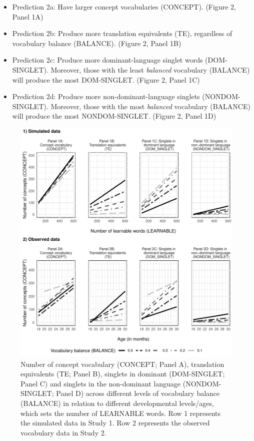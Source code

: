\documentclass[
  english,
  ,man,floatsintext]{apa6}
\providecommand{\tightlist}{%
  \setlength{\itemsep}{0pt}\setlength{\parskip}{0pt}}
\begin{document}
\begin{itemize}
\tightlist
\item
  Prediction 2a: Have larger concept vocabularies (CONCEPT). (Figure 2, Panel 1A)
\item
  Prediction 2b: Produce more translation equivalents (TE), regardless of vocabulary balance (BALANCE). (Figure 2, Panel 1B)
\item
  Prediction 2c: Produce more dominant-language singlet words (DOM-SINGLET). Moreover, those with the least \emph{balanced} vocabulary (BALANCE) will produce the most DOM-SINGLET. (Figure 2, Panel 1C)
\item
  Prediction 2d: Produce more non-dominant-language singlets (NONDOM-SINGLET). Moreover, those with the most \emph{balanced} vocabulary (BALANCE) will produce the most NONDOM-SINGLET. (Figure 2, Panel 1D)
\end{itemize}

\begin{figure}[H]

{\centering \includegraphics[width=1\linewidth]{paper_TE_bilingual_vocabulary_model_files/figure-latex/fig2-1} 

}

\caption{Number of concept vocabulary (CONCEPT; Panel A), translation equivalents (TE; Panel B), singlets in dominant (DOM-SINGLET; Panel C) and singlets in the non-dominant language (NONDOM-SINGLET; Panel D) across different levels of vocabulary balance (BALANCE) in relation to different developmental levels/ages, which sets the number of LEARNABLE words. Row 1 represents the simulated data in Study 1. Row 2 represents the observed vocabulary data in Study 2.}\label{fig:fig2}
\end{figure}
\end{document}
